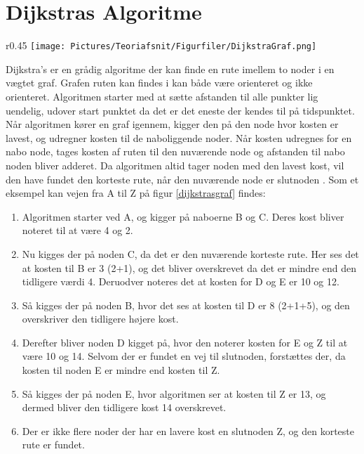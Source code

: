 \section{Dijkstras Algoritme}\label{DijkstraTeori}
\begin{wrapfigure}{r}{0.45\textwidth}
    \centering
  \texttt{[image: Pictures/Teoriafsnit/Figurfiler/DijkstraGraf.png]}
\caption{En vægtet ikke-orienteret graf}\label{dijkstrasgraf}
\end{wrapfigure}

Dijkstra's er en grådig algoritme der kan finde en rute imellem to noder i en vægtet graf. Grafen ruten kan findes i kan både være orienteret og ikke orienteret. Algoritmen starter med at sætte afstanden til alle punkter lig uendelig, udover start punktet da det er det eneste der kendes til på tidspunktet. Når algoritmen kører en graf igennem, kigger den på den node hvor kosten er lavest, og udregner kosten til de naboliggende noder. Når kosten udregnes for en nabo node, tages kosten af ruten til den nuværende node og afstanden til nabo noden bliver adderet. Da algoritmen altid tager noden med den lavest kost, vil den have fundet den korteste rute, når den nuværende node er slutnoden \cite[s. 681-684]{DMATBOGEN}. Som et eksempel kan vejen fra A til Z på figur \ref{dijkstrasgraf} findes:

\begin{enumerate}
\item Algoritmen starter ved A, og kigger på naboerne B og C. Deres kost bliver noteret til at være 4 og 2.
\item Nu kigges der på noden C, da det er den nuværende korteste rute. Her ses det at kosten til B er 3 (2+1), og det bliver overskrevet da det er mindre end den tidligere værdi 4. Deruodver noteres det at kosten for D og E er 10 og 12.
\item Så kigges der på noden B, hvor det ses at kosten til D er 8 (2+1+5), og den overskriver den tidligere højere kost.
\item Derefter bliver noden D kigget på, hvor den noterer kosten for E og Z til at være 10 og 14. Selvom der er fundet en vej til slutnoden, forstættes der, da kosten til noden E er mindre end kosten til Z.
\item Så kigges der på noden E, hvor algoritmen ser at kosten til Z er 13, og dermed bliver den tidligere kost 14 overskrevet.
\item Der er ikke flere noder der har en lavere kost en slutnoden Z, og den korteste rute er fundet.
\end{enumerate}

